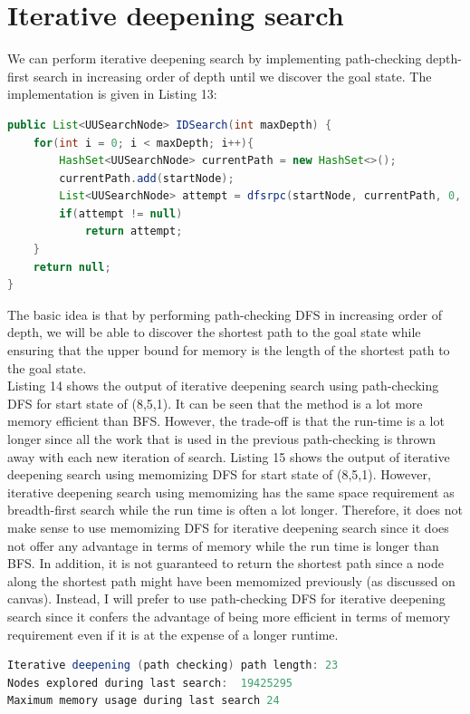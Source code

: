 \documentclass[9.5pt]{extarticle}
\begin{document}
\section{Iterative deepening search}

We can perform iterative deepening search by implementing path-checking depth-first search in increasing order of depth until we discover the goal state. The implementation is given in Listing 13:\\

\begin{lstlisting}[language=java,caption={Iterative deepening search}]
public List<UUSearchNode> IDSearch(int maxDepth) {
	for(int i = 0; i < maxDepth; i++){
		HashSet<UUSearchNode> currentPath = new HashSet<>();
		currentPath.add(startNode);
		List<UUSearchNode> attempt = dfsrpc(startNode, currentPath, 0, i);
		if(attempt != null)
			return attempt;
	}
	return null;
}
\end{lstlisting}

The basic idea is that by performing path-checking DFS in increasing order of depth, we will be able to discover the shortest path to the goal state while ensuring that the upper bound for memory is the length of the shortest path to the goal state. \\

Listing 14 shows the output of iterative deepening search using path-checking DFS for start state of (8,5,1). It can be seen that the method is a lot more memory efficient than BFS. However, the trade-off is that the run-time is a lot longer since all the work that is used in the previous path-checking is thrown away with each new iteration of search. Listing 15 shows the output of iterative deepening search using memomizing DFS for start state of (8,5,1). However, iterative deepening search using memomizing has the same space requirement as breadth-first search while the run time is often a lot longer. Therefore, it does not make sense to use memomizing DFS for iterative deepening search since it does not offer any advantage in terms of memory while the run time is longer than BFS. In addition, it is not guaranteed to return the shortest path since a node along the shortest path might have been memomized previously (as discussed on canvas). Instead, I will prefer to use path-checking DFS for iterative deepening search since it confers the advantage of being more efficient in terms of memory requirement even if it is at the expense of  a longer runtime.

\begin{lstlisting}[language=java,caption={Iterative deepening search using path-checking DFS for start state of (8,5,1)}]
Iterative deepening (path checking) path length: 23 
Nodes explored during last search:  19425295
Maximum memory usage during last search 24
\end{lstlisting}
\end{document}
